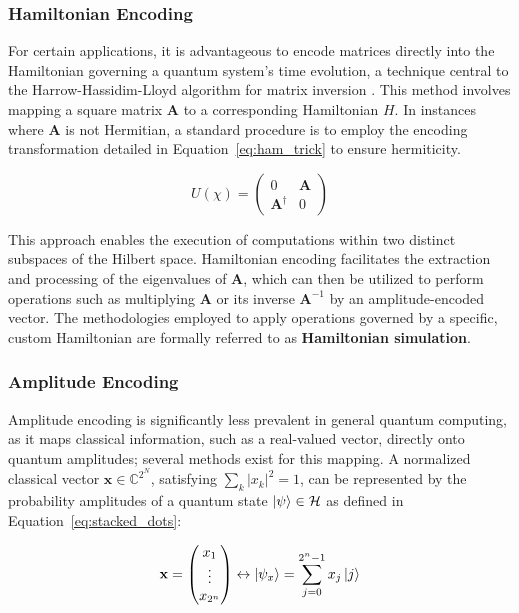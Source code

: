 \documentclass[en]{dimscthesis}
\begin{document}
\subsubsection{Hamiltonian Encoding}

For certain applications, it is advantageous to encode matrices directly into the Hamiltonian governing a quantum system's time evolution, a technique central to the Harrow-Hassidim-Lloyd algorithm for matrix inversion \cite{bib:hhl}. This method involves mapping a square matrix $\mathbf{A}$ to a corresponding Hamiltonian $H$. In instances where $\mathbf{A}$ is not Hermitian, a standard procedure is to employ the encoding transformation detailed in Equation~\ref{eq:ham_trick} to ensure hermiticity. 

\begin{equation}
	U(\chi) = \begin{pmatrix}
		0 & \mathbf{A} \\ 
		\mathbf{A^\dagger} & 0  
	\end{pmatrix} 
	\label{eq:ham_trick}
\end{equation}

This approach enables the execution of computations within two distinct subspaces of the Hilbert space. Hamiltonian encoding facilitates the extraction and processing of the eigenvalues of $\mathbf{A}$, which can then be utilized to perform operations such as multiplying $\mathbf{A}$ or its inverse $\mathbf{A}^{-1}$ by an amplitude-encoded vector. The methodologies employed to apply operations governed by a specific, custom Hamiltonian are formally referred to as \textbf{Hamiltonian simulation}.

\subsubsection{Amplitude Encoding}

Amplitude encoding is significantly less prevalent in general quantum computing, as it maps classical information, such as a real-valued vector, directly onto quantum amplitudes; several methods exist for this mapping. A normalized classical vector $\mathbf{x} \in \mathbb{C}^{2^N}$, satisfying $\sum_{k} |x_k|^2 = 1$, can be represented by the probability amplitudes of a quantum state $\ket{\psi} \in \mathcal{H}$ as defined in Equation~\ref{eq:stacked_dots}:

\begin{equation}
	\mathbf{x} = \begin{pmatrix}
		x_1 \\
		\vdots \\
		x_{2^n}
	\end{pmatrix}
	\leftrightarrow
	\ket{\psi_x} = \sum_{j=0}^{2^n-1} x_j\ket{j}
	\label{eq:stacked_dots}
\end{equation}
\end{document}
